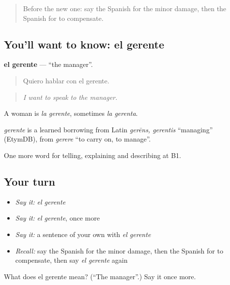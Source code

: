 \begin{quote}
Before the new one: say the Spanish for the minor damage, then the Spanish for to compensate.
\end{quote}

\subsection*{You'll want to know: el gerente}
\textbf{el gerente} — \textquotedblleft{}the manager\textquotedblright{}.

\begin{quote}
Quiero hablar con el gerente.
\end{quote}

\begin{quote}
\emph{I want to speak to the manager.}
\end{quote}

A woman is \emph{la gerente}, sometimes \emph{la gerenta}.

\begin{cousinweb}
\emph{gerente} is a learned borrowing from Latin \emph{gerēns, gerentis} \textquotedblleft{}managing\textquotedblright{} (EtymDB), from \emph{gerere} \textquotedblleft{}to carry on, to manage\textquotedblright{}.
\end{cousinweb}

\begin{grammarlens}[title={What you've built}]
One more word for telling, explaining and describing at B1.
\end{grammarlens}

\subsection*{Your turn}
\begin{itemize}
\raggedright
  \item \emph{Say it:} \emph{el gerente}
  \item \emph{Say it:} \emph{el gerente}, once more
  \item \emph{Say it:} a sentence of your own with \emph{el gerente}
  \item \emph{Recall:} say the Spanish for the minor damage, then the Spanish for to compensate, then say \emph{el gerente} again
\end{itemize}

\begin{tcolorbox}[breakable,colback=teal!4,colframe=teal!35!black,title={Before you move on}]
What does el gerente mean? (\textquotedblleft{}The manager\textquotedblright{}.) Say it once more.
\end{tcolorbox}
